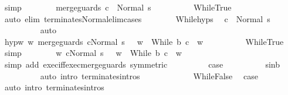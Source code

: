 \begin{isabellebody}
\ simp\isanewline
\ \ \ \ \ \ \isamarkupfalse%
\ {\isachardoublequoteopen}{\isasymGamma}{\isasymturnstile}merge{\isacharunderscore}guards\ c\ {\isasymdown}\ Normal\ s{\isachardoublequoteclose}\isanewline
\ \ \ \ \ \ \ \ \isamarkupfalse%
\ WhileTrue\ \isamarkupfalse%
\ {\isacharparenleft}auto\ elim{\isacharcolon}\ terminates{\isacharunderscore}Normal{\isacharunderscore}elim{\isacharunderscore}cases{\isacharparenright}\isanewline
\ \ \ \ \ \ \isamarkupfalse%
\ While{\isachardot}hyps\ \isamarkupfalse%
\ {\isachardoublequoteopen}{\isasymGamma}{\isasymturnstile}c\ {\isasymdown}\ Normal\ s{\isachardoublequoteclose}\isanewline
\ \ \ \ \ \ \ \ \isamarkupfalse%
\ auto\isanewline
\ \ \ \ \ \ \isamarkupfalse%
\isanewline
\ \ \ \ \ \ \isamarkupfalse%
\ hyp{\isacharunderscore}w{\isacharcolon}\ {\isachardoublequoteopen}{\isasymforall}w{\isachardot}\ {\isasymGamma}{\isasymturnstile}{\isasymlangle}merge{\isacharunderscore}guards\ c{\isacharcomma}Normal\ s\ {\isasymrangle}\ {\isasymRightarrow}\ w\ {\isasymlongrightarrow}\ {\isasymGamma}{\isasymturnstile}While\ b\ c\ {\isasymdown}\ w{\isachardoublequoteclose}\isanewline
\ \ \ \ \ \ \ \ \isamarkupfalse%
\ WhileTrue\ \isamarkupfalse%
\ simp\isanewline
\ \ \ \ \ \ \isamarkupfalse%
\ {\isachardoublequoteopen}{\isasymforall}w{\isachardot}\ {\isasymGamma}{\isasymturnstile}{\isasymlangle}c{\isacharcomma}Normal\ s\ {\isasymrangle}\ {\isasymRightarrow}\ w\ {\isasymlongrightarrow}\ {\isasymGamma}{\isasymturnstile}While\ b\ c\ {\isasymdown}\ w{\isachardoublequoteclose}\isanewline
\ \ \ \ \ \ \ \ \isamarkupfalse%
\ {\isacharparenleft}simp\ add{\isacharcolon}\ exec{\isacharunderscore}iff{\isacharunderscore}exec{\isacharunderscore}merge{\isacharunderscore}guards\ {\isacharbrackleft}symmetric{\isacharbrackright}{\isacharparenright}\isanewline
\ \ \ \ \ \ \isamarkupfalse%
\ \isamarkupfalse%
\ {\isacharquery}case\isanewline
\ \ \ \ \ \ \ \ \isamarkupfalse%
\ s{\isacharunderscore}in{\isacharunderscore}b\isanewline
\ \ \ \ \ \ \ \ \isamarkupfalse%
\ {\isacharparenleft}auto\ intro{\isacharcolon}\ terminates{\isachardot}intros{\isacharparenright}\isanewline
\ \ \ \ \isamarkupfalse%
\isanewline
\ \ \ \ \ \ \isamarkupfalse%
\ WhileFalse\ \isamarkupfalse%
\ {\isacharquery}case\ \isamarkupfalse%
\ {\isacharparenleft}auto\ intro{\isacharcolon}\ terminates{\isachardot}intros{\isacharparenright}\ \isanewline

\end{isabellebody}
